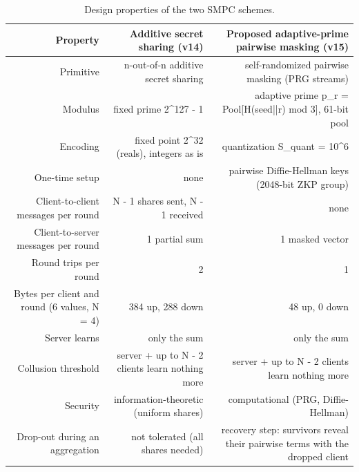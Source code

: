 \begin{table}[t]
\centering
\small
\caption{Design properties of the two SMPC schemes.}
\label{tab:smpc_props}
\begin{tabular}{rrr}
\toprule
Property & Additive secret sharing (v14) & Proposed adaptive-prime pairwise masking (v15) \\
\midrule
Primitive & n-out-of-n additive secret sharing & self-randomized pairwise masking (PRG streams) \\
Modulus & fixed prime 2\^{}127 - 1 & adaptive prime p\_r = Pool[H(seed||r) mod 3], 61-bit pool \\
Encoding & fixed point 2\^{}32 (reals), integers as is & quantization S\_quant = 10\^{}6 \\
One-time setup & none & pairwise Diffie-Hellman keys (2048-bit ZKP group) \\
Client-to-client messages per round & N - 1 shares sent, N - 1 received & none \\
Client-to-server messages per round & 1 partial sum & 1 masked vector \\
Round trips per round & 2 & 1 \\
Bytes per client and round (6 values, N = 4) & 384 up, 288 down & 48 up, 0 down \\
Server learns & only the sum & only the sum \\
Collusion threshold & server + up to N - 2 clients learn nothing more & server + up to N - 2 clients learn nothing more \\
Security & information-theoretic (uniform shares) & computational (PRG, Diffie-Hellman) \\
Drop-out during an aggregation & not tolerated (all shares needed) & recovery step: survivors reveal their pairwise terms with the dropped client \\
\bottomrule
\end{tabular}
\end{table}
